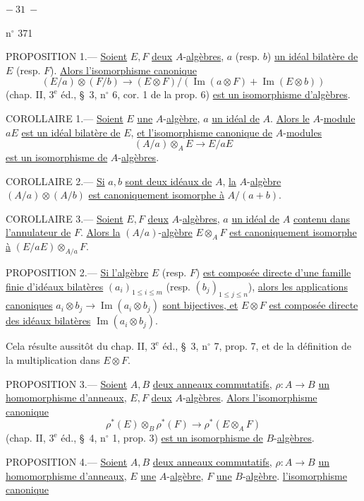 \begin{center}$-\ 31\ -$\end{center}
\hfill n$^\circ$ 371

PROPOSITION 1.--- \uline{Soient} $E,F$ \uline{deux} $A$-\uline{algèbres}, $a$ (resp. $b$) \uline{un idéal bilatère de} $E$ (resp. $F$). \uline{Alors l'isomorphisme canonique}
\[
(E/a)\otimes(F/b)\longrightarrow(E\otimes F)/(\operatorname{Im}(a\otimes F)+\operatorname{Im}(E\otimes b))
\]
(chap. II, $3^{\mathrm e}$ éd., \S\ 3, n$^\circ$ 6, cor. 1 de la prop. 6) \uline{est un isomorphisme d'algèbres}.

COROLLAIRE 1.--- \uline{Soient} $E$ \uline{une} $A$-\uline{algèbre}, $a$ \uline{un idéal de} $A$. \uline{Alors le} $A$-\uline{module} $aE$ \uline{est un idéal bilatère de} $E$, \uline{et l'isomorphisme canonique de} $A$-\uline{modules}
\[
(A/a)\otimes_A E\longrightarrow E/aE
\]
\uline{est un isomorphisme de} $A$-\uline{algèbres}.

COROLLAIRE 2.--- \uline{Si} $a,b$ \uline{sont deux idéaux de} $A$, \uline{la} $A$-\uline{algèbre} $(A/a)\otimes(A/b)$ \uline{est canoniquement isomorphe à} $A/(a+b)$.

COROLLAIRE 3.--- \uline{Soient} $E,F$ \uline{deux} $A$-\uline{algèbres}, $a$ \uline{un idéal de} $A$ \uline{contenu dans l'annulateur de} $F$. \uline{Alors la} $(A/a)$-\uline{algèbre} $E\otimes_A F$ \uline{est canoniquement isomorphe à} $(E/aE)\otimes_{A/a}F$.

PROPOSITION 2.--- \uline{Si l'algèbre} $E$ (resp. $F$) \uline{est composée directe d'une famille finie d'idéaux bilatères} $(a_i)_{1\le i\le m}$ (resp. $(b_j)_{1\le j\le n}$), \uline{alors les applications canoniques} $a_i\otimes b_j\to\operatorname{Im}(a_i\otimes b_j)$ \uline{sont bijectives, et} $E\otimes F$ \uline{est composée directe des idéaux bilatères} $\operatorname{Im}(a_i\otimes b_j)$.

Cela résulte aussitôt du chap. II, $3^{\mathrm e}$ éd., \S\ 3, n$^\circ$ 7, prop. 7, et de la définition de la multiplication dans $E\otimes F$.

PROPOSITION 3.--- \uline{Soient} $A,B$ \uline{deux anneaux commutatifs}, $\rho:A\to B$ \uline{un homomorphisme d'anneaux}, $E,F$ \uline{deux} $A$-\uline{algèbres}. \uline{Alors l'isomorphisme canonique}
\[
\rho^*(E)\otimes_B\rho^*(F)\longrightarrow\rho^*(E\otimes_A F)
\]
(chap. II, $3^{\mathrm e}$ éd., \S\ 4, n$^\circ$ 1, prop. 3) \uline{est un isomorphisme de} $B$-\uline{algèbres}.

PROPOSITION 4.--- \uline{Soient} $A,B$ \uline{deux anneaux commutatifs}, $\rho:A\to B$ \uline{un homomorphisme d'anneaux}, $E$ \uline{une} $A$-\uline{algèbre}, $F$ \uline{une} $B$-\uline{algèbre}. \uline{ l'isomorphisme canonique}
